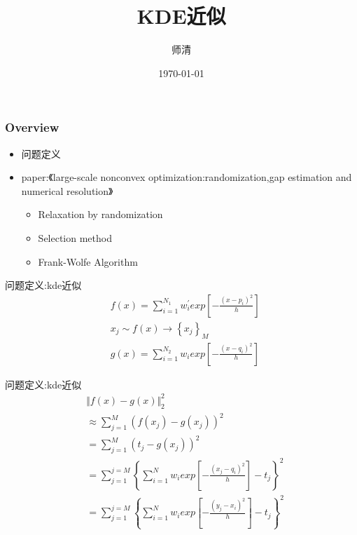 \documentclass{beamer}
\title[KDE近似]{KDE近似} %
\author{师清} %
\institute[FDU]{FDU}
\date{\today} %
\begin{document}
\begin{frame}
	\titlepage %
\end{frame}

\begin{frame}
	\frametitle{Overview} %
	\tableofcontents %
	\begin{itemize}
		\item 问题定义
		\item paper:《large-scale nonconvex optimization:randomization,gap estimation and numerical resolution》
		\begin{itemize}
			\item Relaxation by randomization
			\item Selection method
			\item Frank-Wolfe Algorithm 
		\end{itemize}

	\end{itemize}
\end{frame}

\begin{frame}{问题定义:kde近似}
\begin{align}
	& f(x) = \sum_{i=1}^{N_1}w_i^{'}exp\left[-\frac{(x-p_i)^2}{h}\right] \nonumber \\
	& x_j \sim f(x) \rightarrow \left\{x_j\right\}_M \nonumber \\
	& g(x) = \sum_{i=1}^{N_2}w_iexp\left[-\frac{(x-q_i)^2}{h}\right] \nonumber
\end{align}
\end{frame}

\begin{frame}{问题定义:kde近似}
	\begin{align}
	& \Vert f(x)-g(x) \Vert_2^2 \nonumber\\
	& \approx  \sum_{j=1}^{M} \left( f(x_j)- g(x_j) \right)^2\nonumber \\
	& = \sum_{j=1}^{M}\left(t_j-g(x_j)  \right)^2\nonumber \\
	& = \sum_{j=1}^{j=M}\left\{\sum_{i=1}^{N}w_iexp\left[-\frac{(x_j-q_i)^2}{h}\right]-t_j\right\}^2\nonumber\\
	& = \sum_{j=1}^{j=M}\left\{\sum_{i=1}^{N}w_iexp\left[-\frac{(y_j-x_i)^2}{h}\right]-t_j\right\}^2 \nonumber
	\end{align}
\end{frame}
\end{document}
